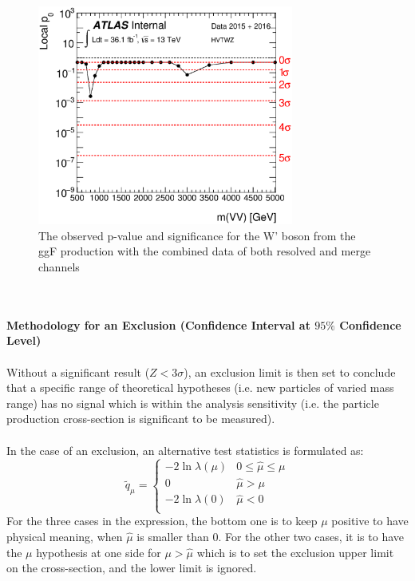 \begin{figure}
	\includegraphics[width=0.75\textwidth]{Chapter4/VVM_p0_HVTWZ_ggF.eps}
	\caption{The observed p-value and significance for the W' boson from the ggF production with the combined data of both resolved and merge channels }
	\label{Fig:pvalue_hvt}
\end{figure}
\noindent
\\
\\{\bf Methodology for an Exclusion (Confidence Interval at $95\%$ Confidence Level)}
\\
\\Without a significant result ($Z<3\sigma$), an exclusion limit is then set to conclude that a specific range of theoretical hypotheses (i.e. new particles of varied mass range) has no signal which is within the analysis sensitivity (i.e. the particle production cross-section is significant to be measured). 
\\
\\In the case of an exclusion, an alternative test statistics is formulated as:
\begin{equation}
\tilde{q}_{\mu} = 
\begin{cases}
-2 \ln \lambda(\mu) & 0 \le \hat{\mu} \le \mu \\
0 & \hat{\mu} > \mu \\
-2 \ln \lambda(0) & \hat{\mu} < 0 \\
\end{cases}
\end{equation}
For the three cases in the expression, the bottom one is to keep $\mu$ positive to have physical meaning, when $\hat{\mu}$ is smaller than 0. For the other two cases, it is to have the $\mu$ hypothesis at one side for $\mu>\hat{\mu}$ which is to set the exclusion upper limit on the cross-section, and the lower limit is ignored. 
